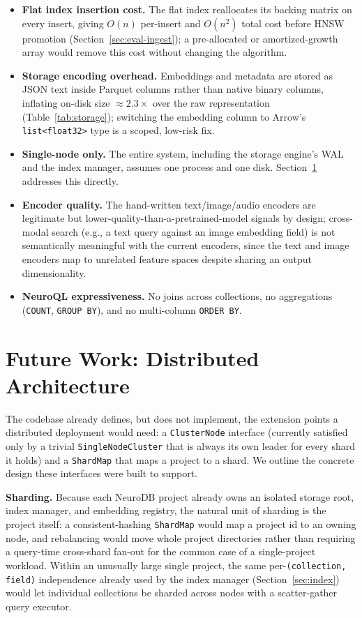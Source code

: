 \documentclass[conference]{IEEEtran}
\begin{document}
\begin{itemize}
  \item \textbf{Flat index insertion cost.} The flat index reallocates its backing matrix on
    every insert, giving $O(n)$ per-insert and $O(n^2)$ total cost before HNSW promotion
    (Section~\ref{sec:eval-ingest}); a pre-allocated or amortized-growth array would remove
    this cost without changing the algorithm.
  \item \textbf{Storage encoding overhead.} Embeddings and metadata are stored as JSON text
    inside Parquet columns rather than native binary columns, inflating on-disk size
    $\approx2.3\times$ over the raw representation (Table~\ref{tab:storage}); switching the
    embedding column to Arrow's \texttt{list<float32>} type is a scoped, low-risk fix.
  \item \textbf{Single-node only.} The entire system, including the storage engine's WAL and
    the index manager, assumes one process and one disk. Section~\ref{sec:future} addresses
    this directly.
  \item \textbf{Encoder quality.} The hand-written text/image/audio encoders are legitimate
    but lower-quality-than-a-pretrained-model signals by design; cross-modal search (e.g., a
    text query against an image embedding field) is not semantically meaningful with the
    current encoders, since the text and image encoders map to unrelated feature spaces
    despite sharing an output dimensionality.
  \item \textbf{NeuroQL expressiveness.} No joins across collections, no aggregations
    (\texttt{COUNT}, \texttt{GROUP BY}), and no multi-column \texttt{ORDER BY}.
\end{itemize}

\section{Future Work: Distributed Architecture}
\label{sec:future}

The codebase already defines, but does not implement, the extension points a distributed
deployment would need: a \texttt{ClusterNode} interface (currently satisfied only by a
trivial \texttt{SingleNodeCluster} that is always its own leader for every shard it holds)
and a \texttt{ShardMap} that maps a project to a shard. We outline the concrete design these
interfaces were built to support.

\textbf{Sharding.} Because each NeuroDB project already owns an isolated storage root, index
manager, and embedding registry, the natural unit of sharding is the project itself:
a consistent-hashing \texttt{ShardMap} would map a project id to an owning node, and
rebalancing would move whole project directories rather than requiring a query-time
cross-shard fan-out for the common case of a single-project workload. Within an
unusually large single project, the same per-\texttt{(collection, field)} independence
already used by the index manager (Section~\ref{sec:index}) would let individual
collections be sharded across nodes with a scatter-gather query executor.
\end{document}
